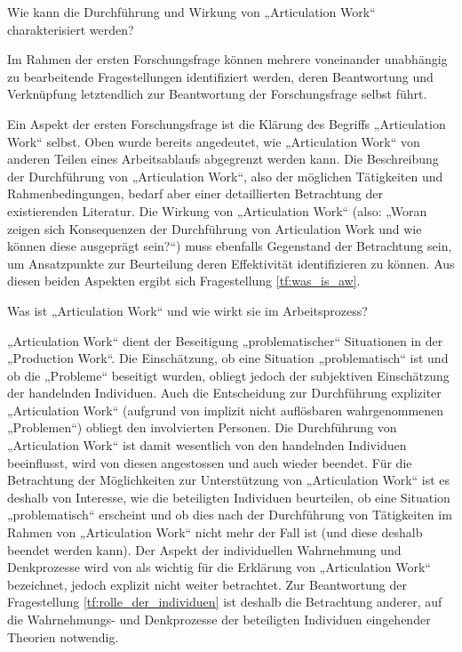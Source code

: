 \begin{ff}
	\label{ff:beschreibung}
	Wie kann die Durchführung und Wirkung von „Articulation Work“ charakterisiert werden?
\end{ff}

Im Rahmen der ersten Forschungsfrage können mehrere voneinander unabhängig zu bearbeitende Fragestellungen identifiziert werden, deren Beantwortung und Verknüpfung letztendlich zur Beantwortung der Forschungsfrage selbst führt.

Ein Aspekt der ersten Forschungsfrage ist die Klärung des Begriffs „Articulation Work“ selbst. Oben wurde bereits angedeutet, wie „Articulation Work“ von anderen Teilen eines Arbeitsablaufs abgegrenzt werden kann. Die Beschreibung der Durchführung von „Articulation Work“, also der möglichen Tätigkeiten und Rahmenbedingungen, bedarf aber einer detaillierten Betrachtung der existierenden Literatur. Die Wirkung von „Articulation Work“ (also: „Woran zeigen sich Konsequenzen der Durchführung von Articulation Work und wie können diese ausgeprägt sein?“) muss ebenfalls Gegenstand der Betrachtung sein, um Ansatzpunkte zur Beurteilung deren Effektivität identifizieren zu können. Aus diesen beiden Aspekten ergibt sich Fragestellung \ref{tf:was_is_aw}.

\begin{tf}
	\label{tf:was_is_aw}
	Was ist „Articulation Work“ und wie wirkt sie im Arbeitsprozess?
\end{tf}

„Articulation Work“ dient der Beseitigung „problematischer“ Situationen in der „Production Work“. Die Einschätzung, ob eine Situation „problematisch“ ist und ob die „Probleme“ beseitigt wurden, obliegt jedoch der subjektiven Einschätzung der handelnden Individuen. Auch die Entscheidung zur Durchführung expliziter „Articulation Work“ (aufgrund von implizit nicht auflösbaren wahrgenommenen „Problemen“) obliegt den involvierten Personen. Die Durchführung von „Articulation Work“ ist damit wesentlich von den handelnden Individuen beeinflusst, wird von diesen angestossen und auch wieder beendet. Für die Betrachtung der Möglichkeiten zur Unterstützung von „Articulation Work“ ist es deshalb von Interesse, wie die beteiligten Individuen beurteilen, ob eine Situation „problematisch“ erscheint und ob dies nach der Durchführung von Tätigkeiten im Rahmen von „Articulation Work“ nicht mehr der Fall ist (und diese deshalb beendet werden kann). Der Aspekt der individuellen Wahrnehmung und Denkprozesse wird von \citet[][S. 131]{Strauss93} als wichtig für die Erklärung von „Articulation Work“ bezeichnet, jedoch explizit nicht weiter betrachtet. Zur Beantwortung der Fragestellung \ref{tf:rolle_der_individuen} ist deshalb die Betrachtung anderer, auf die Wahrnehmungs- und Denkprozesse der beteiligten Individuen eingehender Theorien notwendig.

